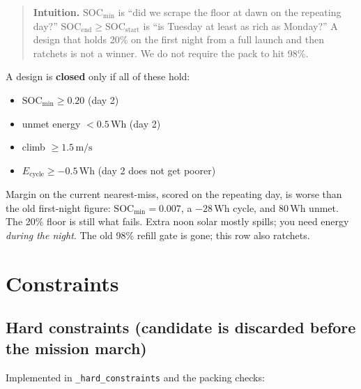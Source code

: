 \documentclass[11pt,letterpaper]{article}
\newcommand{\code}[1]{\texttt{#1}}
\newenvironment{intuition}{\begin{quote}\small}{\end{quote}}
\begin{document}
\begin{intuition}
\textbf{Intuition.} $\mathrm{SOC}_\mathrm{min}$ is ``did we scrape the floor at dawn on the repeating day?'' $\mathrm{SOC}_\mathrm{end} \ge \mathrm{SOC}_\mathrm{start}$ is ``is Tuesday at least as rich as Monday?'' A design that holds 20\% on the first night from a full launch and then ratchets is not a winner. We do not require the pack to hit 98\%.
\end{intuition}

A design is \textbf{closed} only if all of these hold:

\begin{itemize}
  \item $\mathrm{SOC}_\mathrm{min} \ge 0.20$ (day 2)
  \item unmet energy $< 0.5\,\mathrm{Wh}$ (day 2)
  \item climb $\ge 1.5\,\mathrm{m/s}$
  \item $E_\mathrm{cycle} \ge -0.5\,\mathrm{Wh}$ (day 2 does not get poorer)
\end{itemize}

Margin on the current nearest-miss, scored on the repeating day, is worse than the old first-night figure: $\mathrm{SOC}_\mathrm{min} = 0.007$, a $-28\,\mathrm{Wh}$ cycle, and $80\,\mathrm{Wh}$ unmet. The 20\% floor is still what fails. Extra noon solar mostly spills; you need energy \emph{during the night}. The old 98\% refill gate is gone; this row also ratchets.

\section{Constraints}

\subsection{Hard constraints (candidate is discarded before the mission march)}

Implemented in \code{\_hard\_constraints} and the packing checks:
\end{document}
